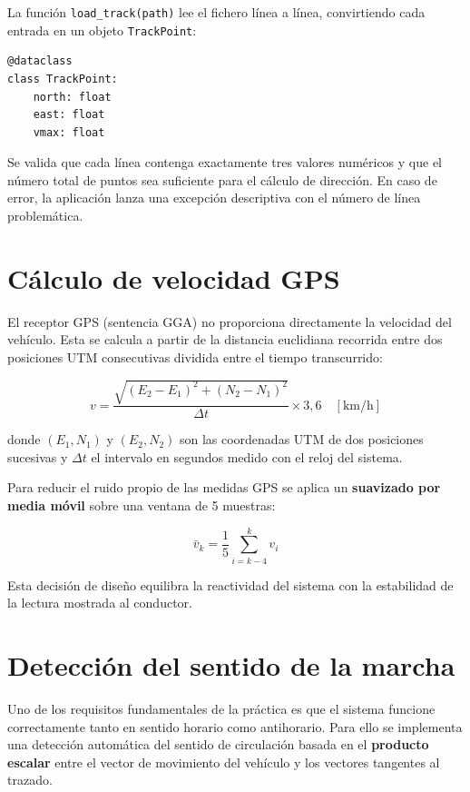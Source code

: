 \documentclass[10pt]{article}
\begin{document}
La función \texttt{load\_track(path)} lee el fichero línea a línea, convirtiendo cada entrada en un objeto \texttt{TrackPoint}:

\begin{lstlisting}[style=pythonEstilo]
@dataclass
class TrackPoint:
    north: float
    east: float
    vmax: float
\end{lstlisting}

Se valida que cada línea contenga exactamente tres valores numéricos y que el número total de puntos sea suficiente para el cálculo de dirección. En caso de error, la aplicación lanza una excepción descriptiva con el número de línea problemática.

\section{Cálculo de velocidad GPS}

El receptor GPS (sentencia GGA) no proporciona directamente la velocidad del vehículo. Esta se calcula a partir de la distancia euclidiana recorrida entre dos posiciones UTM consecutivas dividida entre el tiempo transcurrido:

\[
v = \frac{\sqrt{(E_2 - E_1)^2 + (N_2 - N_1)^2}}{\Delta t} \times 3{,}6 \quad [\text{km/h}]
\]

donde $(E_1, N_1)$ y $(E_2, N_2)$ son las coordenadas UTM de dos posiciones sucesivas y $\Delta t$ el intervalo en segundos medido con el reloj del sistema.

Para reducir el ruido propio de las medidas GPS se aplica un \textbf{suavizado por media móvil} sobre una ventana de 5 muestras:

\[
\bar{v}_k = \frac{1}{5} \sum_{i=k-4}^{k} v_i
\]

Esta decisión de diseño equilibra la reactividad del sistema con la estabilidad de la lectura mostrada al conductor.

\section{Detección del sentido de la marcha}

Uno de los requisitos fundamentales de la práctica es que el sistema funcione correctamente tanto en sentido horario como antihorario. Para ello se implementa una detección automática del sentido de circulación basada en el \textbf{producto escalar} entre el vector de movimiento del vehículo y los vectores tangentes al trazado.
\end{document}
